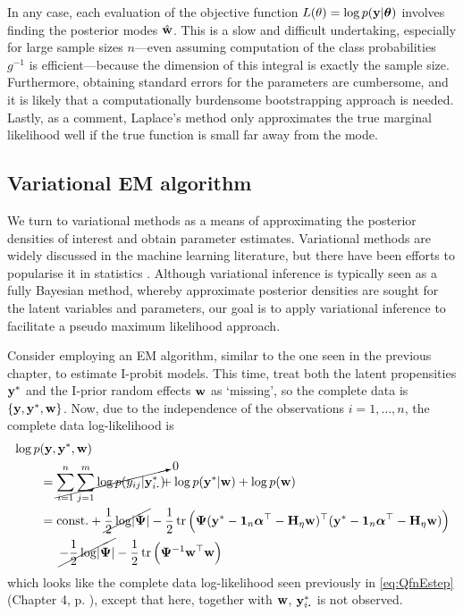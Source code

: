 In any case, each evaluation of the objective function $L(\theta) = \log p({\mathbf y}|{\bm\theta})$ involves finding the posterior modes $\hat{{\mathbf w}}$.
This is a slow and difficult undertaking, especially for large sample sizes $n$---even assuming computation of the class probabilities $g^{-1}$ is efficient---because the dimension of this integral is exactly the sample size.
Furthermore, obtaining standard errors for the parameters are cumbersome, and it is likely that a computationally burdensome bootstrapping approach is needed.
Lastly, as a comment, Laplace's method only approximates the true marginal likelihood well if the true function is small far away from the mode.

\subsection{Variational EM algorithm}

We turn to variational methods as a means of approximating the posterior densities of interest and obtain parameter estimates.
Variational methods are widely discussed in the machine learning literature, but there have been efforts to popularise it in statistics \citep{blei2017variational}.
Although variational inference is typically seen as a fully Bayesian method, whereby approximate posterior densities are sought for the latent variables and parameters, our goal is to apply variational inference to facilitate a pseudo maximum likelihood approach.

Consider employing an EM algorithm, similar to the one seen in the previous chapter, to estimate I-probit models.
This time, treat both the latent propensities ${\mathbf y}^*$ and the I-prior random effects ${\mathbf w}$ as `missing', so the complete data is $\{{\mathbf y},{\mathbf y}^*,{\mathbf w}\}$.
Now, due to the independence of the observations $i=1,\dots,n$, the complete data log-likelihood is
\begin{align}
  \log p&(\by,\by^*,\bw) \nonumber \\
  &= \cancelto{0}{\sum_{i=1}^n \sum_{j=1}^m \log p(y_{ij}|\by^*_{i \bigcdot})} \!\!\!
  + \log p(\by^*|\bw) + \log p(\bw) \nonumber \\
  &= \const + \cancel{\half\log\abs{\bPsi}} - \half \tr  
  \Big(
    \bPsi(\by^* - \bone_n\balpha^\top - \bH_\eta\bw)^\top 
    (\by^* - \bone_n\balpha^\top - \bH_\eta\bw)
  \Big) \nonumber \\
  &\phantom{==} \cancel{- \half\log\abs{\bPsi}} 
  - \half \tr \Big(\bPsi^{-1} \bw^\top  \bw \Big)
  \label{eq:logjointprobit}
\end{align}
which looks like the complete data log-likelihood seen previously in \cref{eq:QfnEstep} (Chapter 4, p. \pageref{eq:QfnEstep}), except that here, together with ${\mathbf w}$, $\by^*_{i \bigcdot}$ is not observed.

